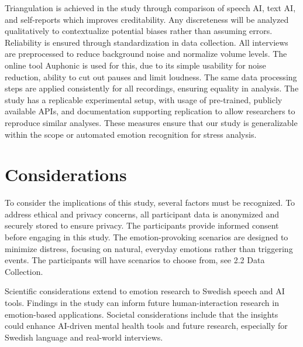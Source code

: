 Triangulation is achieved in the study through comparison of speech AI, text AI, and self-reports which improves creditability. Any discreteness will be analyzed qualitatively to contextualize potential biases rather than assuming errors. 
Reliability is ensured through standardization in data collection. All interviews are preprocessed to reduce background noise and normalize volume levels. The online tool Auphonic \autocite{Auphonic} is used for this, due to its simple usability for noise reduction, ability to cut out pauses and limit loudness. The same data processing steps are applied consistently for all recordings, ensuring equality in analysis. The study has a replicable experimental setup, with usage of pre-trained, publicly available APIs, and documentation supporting replication to allow researchers to reproduce similar analyses. These measures ensure that our study is generalizable within the scope or automated emotion recognition for stress analysis. 

\section{Considerations}
To consider the implications of this study, several factors must be recognized. To address ethical and privacy concerns, all participant data is anonymized and securely stored to ensure privacy. The participants provide informed consent before engaging in this study. The emotion-provoking scenarios are designed to minimize distress, focusing on natural, everyday emotions rather than triggering events. The participants will have scenarios to choose from, see 2.2 Data Collection. 

Scientific considerations extend to emotion research to Swedish speech and AI tools. Findings in the study can inform future human-interaction research in emotion-based applications. Societal considerations include that the insights could enhance AI-driven mental health tools and future research, especially for Swedish language and real-world interviews. 
